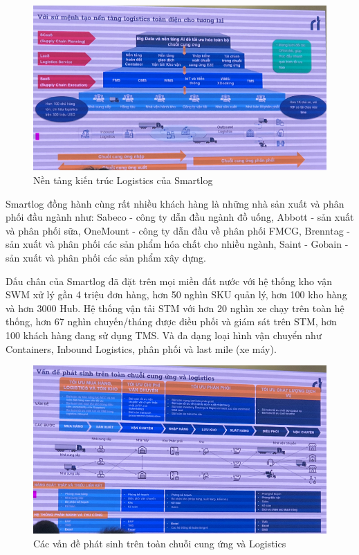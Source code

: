 \documentclass[14pt, a4paper]{article}
\numberwithin{equation}{section}
\numberwithin{figure}{section}
\numberwithin{dl}{section}
\numberwithin{md}{section}
\numberwithin{bd}{section}
\numberwithin{dn}{section}
\numberwithin{hq}{section}
\begin{document}
    \begin{figure}[h!]
        \centering
        \includegraphics[scale=0.6]{Smartlog_Infra.png}
        \caption{Nền tảng kiến trúc Logistics của Smartlog}
    \end{figure}

    Smartlog đồng hành cùng rất nhiều khách hàng là những nhà sản xuất và phân phối đầu ngành như: Sabeco - công ty dẫn đầu ngành đồ uống, Abbott - sản xuất và phân phối sữa, OneMount - công ty dẫn đầu về phân phối FMCG, Brenntag - sản xuất và phân phối các sản phẩm hóa chất cho nhiều ngành, Saint - Gobain - sản xuất và phân phối các sản phẩm xây dựng.

    Dấu chân của Smartlog đã đặt trên mọi miền đất nước với hệ thống kho vận SWM xử lý gần 4 triệu đơn hàng, hơn 50 nghìn SKU quản lý, hơn 100 kho hàng và hơn 3000 Hub.
    Hệ thống vận tải STM với hơn 20 nghìn xe chạy trên toàn hệ thống, hơn 67 nghìn chuyến/tháng được điều phối và giám sát trên STM, hơn 100 khách hàng đang sử dụng TMS.
    Và đa dạng loại hình vận chuyển như Containers, Inbound Logistics, phân phối và last mile (xe máy).

    \begin{figure}[h!]
        \centering
        \includegraphics[scale=0.6]{Logistic_Problem.png}
        \caption{Các vấn đề phát sinh trên toàn chuỗi cung ứng và Logistics}
    \end{figure}
\end{document}
